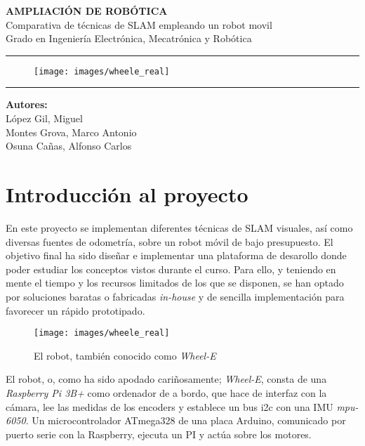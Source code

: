 \documentclass[a4paper,twoside]{article}
\begin{document}

\begin{titlepage}
\centering
\Huge{\textbf{AMPLIACIÓN DE ROBÓTICA}} \\
\Huge{Comparativa de técnicas de SLAM empleando un robot movil}\\

\vspace{2cm}
\LARGE{Grado en Ingeniería Electrónica, Mecatrónica y Robótica}\\
\rule{\textwidth}{0.1mm}
\begin{figure}[h!]
	\centering
	\texttt{[image: images/wheele\_real]}
\end{figure}
\vspace{2cm}
\rule{\textwidth}{0.1mm}
\Large{\textbf{Autores:} \\
                         López Gil, Miguel \\
                         Montes Grova, Marco Antonio\\
                         Osuna Cañas, Alfonso Carlos}
\end{titlepage}
\newpage
\tableofcontents
\newpage
\section{Introducción al proyecto}
En este proyecto se implementan diferentes técnicas de SLAM visuales, así como diversas fuentes de odometría, sobre un robot móvil de bajo presupuesto. El objetivo final ha
sido diseñar e implementar una plataforma de desarollo donde poder estudiar los conceptos vistos durante el curso. Para ello, y teniendo en mente el tiempo y los recursos 
limitados de los que se disponen, se han optado por soluciones baratas o fabricadas \textit{in-house} y de sencilla implementación para favorecer un rápido prototipado.
\begin{figure}[h!]
	\centering
	\texttt{[image: images/wheele\_real]}
	\caption{El robot, también conocido como \textit{Wheel-E}}
\end{figure}

El robot, o, como ha sido apodado cariñosamente; \textit{Wheel-E}, consta de una \textit{Raspberry Pi 3B+} como ordenador de a bordo, que hace de interfaz con la cámara, lee 
las medidas de los encoders y establece un bus i2c con una IMU \textit{mpu-6050}. Un microcontrolador ATmega328 de una placa Arduino, comunicado por puerto serie con la
Raspberry, ejecuta un PI y actúa sobre los motores.\\
\end{document}
